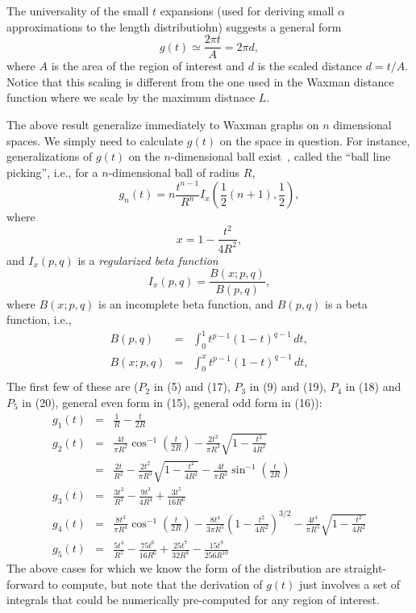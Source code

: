 \documentclass{article}
\begin{document}
The universality of the small $t$ expansions (used for deriving small
$\alpha$ approximations to the length distributiohn) suggests a
general form
\[ g(t) \simeq \frac{2 \pi t}{A} = 2 \pi d, \]
where $A$ is the area of the region of interest and $d$ is the scaled
distance $d = t/A$. Notice that this scaling is different from the one
used in the Waxman distance function where we scale by the maximum
distnace $L$. 

The above result generalize immediately to Waxman graphs on $n$
dimensional spaces. We simply need to calculate $g(t)$ on the space in
question. For instance, generalizations of $g(t)$ on the
$n$-dimensional ball exist~\cite{tu00:_circle_line}, called the ``ball
line picking'', i.e., for a $n$-dimensional ball of radius $R$,
\[ g_n(t) = n \frac{t^{n-1}}{R^n} I_x\left( 
  \frac{1}{2} (n+1), \frac{1}{2}
                      \right),
\]
where
\[ x = 1 - \frac{t^2}{4 R^2}, \]
and $I_x(p,q)$ is a {\em regularized beta function}
\[  I_x(p,q) = \frac{ B(x; p,q)}{B(p,q)}, \]
where $B(x; p,q)$ is an incomplete beta function, and $B(p,q)$ is a
beta function, i.e., 
\begin{eqnarray*}
  B(p,q)    & = & \int_0^1 t^{p-1} (1 - t)^{q-1} \, dt, \\
  B(x; p,q) & = & \int_0^x t^{p-1} (1 - t)^{q-1} \, dt, \\
\end{eqnarray*}
The first few of these are \cite{tu00:_circle_line} ($P_2$ in (5) and
(17), $P_3$ in (9) and (19), $P_4$ in (18) and $P_5$ in (20), general
even form in (15), general odd form in (16)):
\begin{eqnarray}
  \label{eq:ball_line_picking}
  g_1(t) & = & \frac{1}{R} - \frac{t}{2 R}   \label{eq:line_line_picking} \\
  g_2(t) & = & \frac{4 t}{\pi R^2} \cos^{-1} \left( \frac{t}{2R} \right) 
               - \frac{2 t^2}{\pi R^3} \sqrt{1 - \frac{t^2}{4 R^2} } \label{eq:2dball_line_picking} \\
          & = & \frac{2 t}{R^2} 
               - \frac{2 t^2}{\pi R^3} \sqrt{1 - \frac{t^2}{4 R^2} }
               - \frac{4 t}{\pi R^2} \sin^{-1} \left( \frac{t}{2R} \right) \label{eq:2dball_line_picking2}  \\
  g_3(t) & = & \frac{3 t^2}{R^3} - \frac{9 t^3}{4 R^4} + \frac{3 t^5}{16 R^6}   \label{eq:sphere_line_picking}  \\
  g_4(t) & = &  \frac{8 t^3}{\pi R^4} \cos^{-1} \left( \frac{t}{2R} \right) 
               - \frac{8 t^4}{3 \pi R^5} \left( 1 - \frac{t^2}{4 R^2} \right)^{3/2}
               - \frac{4 t^4}{\pi R^5} \sqrt{1 - \frac{t^2}{4 R^2} } \\
  g_5(t) & = & \frac{5 t^4}{R^5} - \frac{75 t^6}{16 R^6} + \frac{25 t^7}{32 R^8} - \frac{15 t^9}{256 R^{10}}  
  \label{eq:ball_line_picking-end}
\end{eqnarray}
The above cases for which we know the form of the distribution are
straight-forward to compute, but note that the derivation of $g(t)$
just involves a set of integrals that could be numerically
pre-computed for any region of interest.  
 
\end{document}
